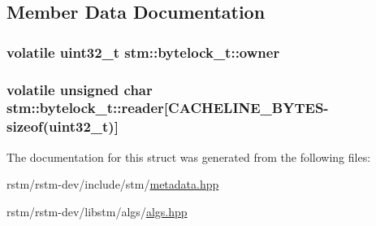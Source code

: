 \subsection{Member Data Documentation}
\hypertarget{structstm_1_1bytelock__t_aa8374c1b43bca7bde750523925e2ccc5}{
\subsubsection[{owner}]{\setlength{\rightskip}{0pt plus 5cm}volatile uint32\-\_\-t stm\-::bytelock\-\_\-t\-::owner}}\label{structstm_1_1bytelock__t_aa8374c1b43bca7bde750523925e2ccc5}
\hypertarget{structstm_1_1bytelock__t_a00f1e7e9b66381db5b9a0ffb39912342}{
\subsubsection[{reader}]{\setlength{\rightskip}{0pt plus 5cm}volatile unsigned char stm\-::bytelock\-\_\-t\-::reader\mbox{[}{\bf C\-A\-C\-H\-E\-L\-I\-N\-E\-\_\-\-B\-Y\-T\-E\-S}-\/sizeof(uint32\-\_\-t)\mbox{]}}}\label{structstm_1_1bytelock__t_a00f1e7e9b66381db5b9a0ffb39912342}


The documentation for this struct was generated from the following files\-:\begin{DoxyCompactItemize}
\item 
rstm/rstm-\/dev/include/stm/\hyperlink{metadata_8hpp}{metadata.\-hpp}\item 
rstm/rstm-\/dev/libstm/algs/\hyperlink{algs_8hpp}{algs.\-hpp}\end{DoxyCompactItemize}
